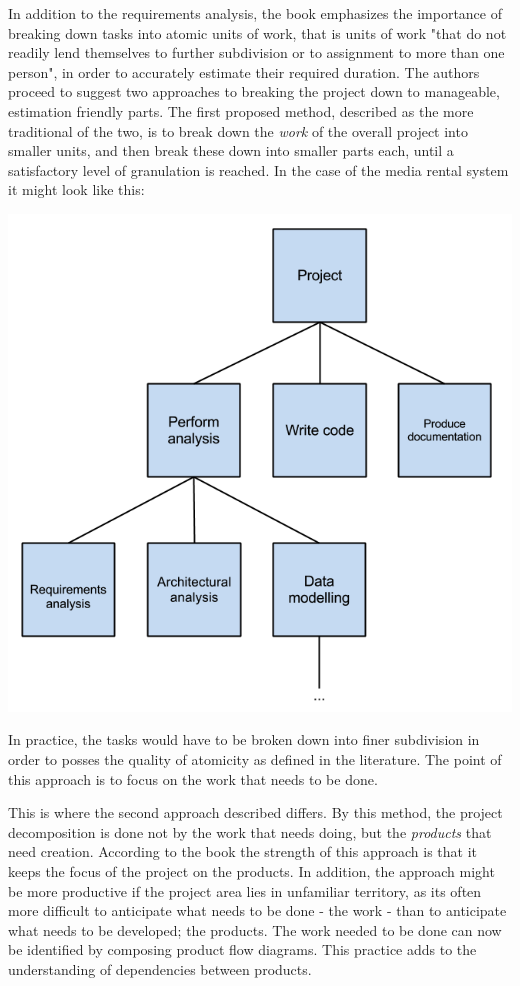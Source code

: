 In addition to the requirements analysis, the book emphasizes the importance of breaking down tasks into atomic units of work, that is units of work "that do not readily lend themselves to further subdivision or to assignment to more than one person", in order to accurately estimate their required duration. The authors proceed to suggest two approaches to breaking the project down to manageable, estimation friendly parts. The first proposed method, described as the more traditional of the two, is to break down the \textit{work} of the overall project into smaller units, and then break these down into smaller parts each, until a satisfactory level of granulation is reached. In the case of the media rental system it might look like this:

\begin{center}
\includegraphics[scale=0.5]{TaskBreakdown.png}
\end{center}

In practice, the tasks would have to be broken down into finer subdivision in order to posses the quality of atomicity as defined in the literature. The point of this approach is to focus on the work that needs to be done.

This is where the second approach described differs. By this method, the project decomposition is done not by the work that needs doing, but the \textit{products}  that need creation. According to the book the strength of this approach is that it keeps the focus of the project on the products. In addition, the approach might be more productive if the project area lies in unfamiliar territory, as its often more difficult to anticipate what needs to be done - the work - than to anticipate what needs to be developed; the products. The work needed to be done can now be identified by composing product flow diagrams. This practice adds to the understanding of dependencies between products.


